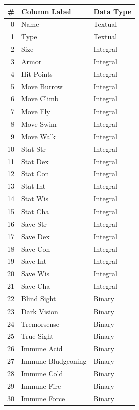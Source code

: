 \documentclass{article}
\begin{document}
\begin{table}[!htbp] \centering 
	\caption{\bfseries Initial Dataset} 
	\label{tab:initial-dataset}

\begin{footnotesize}
\begin{minipage}[b]{0.45\linewidth}\centering
\begin{longtable}[]{@{}rll@{}}
	\toprule
	\# & Column Label & Data Type \\
	\midrule
	\endhead
	0 & Name & Textual \\
	1 & Type & Textual \\
	2 & Size & Integral \\
	3 & Armor & Integral \\
	4 & Hit Points & Integral \\
	5 & Move Burrow & Integral \\
	6 & Move Climb & Integral \\
	7 & Move Fly & Integral \\
	8 & Move Swim & Integral \\
	9 & Move Walk & Integral \\
	10 & Stat Str & Integral \\
	11 & Stat Dex & Integral \\
	12 & Stat Con & Integral \\
	13 & Stat Int & Integral \\
	14 & Stat Wis & Integral \\
	15 & Stat Cha & Integral \\
	16 & Save Str & Integral \\
	17 & Save Dex & Integral \\
	18 & Save Con & Integral \\
	19 & Save Int & Integral \\
	20 & Save Wis & Integral \\
	21 & Save Cha & Integral \\
	22 & Blind Sight & Binary \\
	23 & Dark Vision & Binary \\
	24 & Tremorsense & Binary \\
	25 & True Sight & Binary \\
	26 & Immune Acid & Binary \\
	27 & Immune Bludgeoning & Binary \\
	28 & Immune Cold & Binary \\
	29 & Immune Fire & Binary \\
	30 & Immune Force & Binary \\

\end{longtable}
\end{minipage}
\end{footnotesize}
\end{table}
\end{document}

